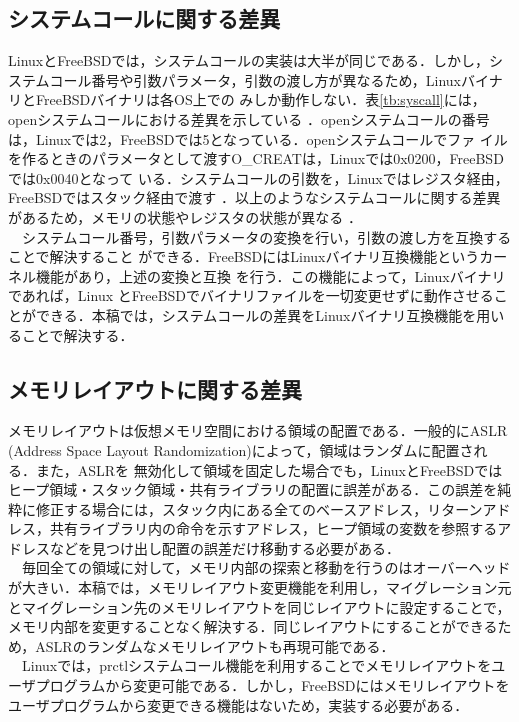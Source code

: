 \documentclass{ipsjpapers}
\begin{document}
\subsection{システムコールに関する差異}
\label{se:syscall}
LinuxとFreeBSDでは，システムコールの実装は大半が同じである．しかし，システムコール番号や引数パラメータ，引数の渡し方が異なるため，LinuxバイナリとFreeBSDバイナリは各OS上での
みしか動作しない．表\ref{tb:syscall}には，openシステムコールにおける差異を示している
．openシステムコールの番号は，Linuxでは2，FreeBSDでは5となっている．openシステムコールでファ
イルを作るときのパラメータとして渡すO\_CREATは，Linuxでは0x0200，FreeBSDでは0x0040となって
いる．システムコールの引数を，Linuxではレジスタ経由，FreeBSDではスタック経由で渡す
．以上のようなシステムコールに関する差異があるため，メモリの状態やレジスタの状態が異なる
．\\
　システムコール番号，引数パラメータの変換を行い，引数の渡し方を互換することで解決すること
ができる．FreeBSDにはLinuxバイナリ互換機能\cite{linux-emu}というカーネル機能があり，上述の変換と互換
を行う．この機能によって，Linuxバイナリであれば，Linux
とFreeBSDでバイナリファイルを一切変更せずに動作させることができる．本稿では，システムコールの差異をLinuxバイナリ互換機能を用いることで解決する．

\subsection{メモリレイアウトに関する差異}
\label{se:memory}
メモリレイアウトは仮想メモリ空間における領域の配置である．一般的にASLR (Address Space
Layout Randomization)によって，領域はランダムに配置される．また，ASLRを
無効化して領域を固定した場合でも，LinuxとFreeBSDではヒープ領域・スタック領域・共有ライブラリの配置に誤差がある．この誤差を純粋に修正する場合には，スタック内にある全てのベースアドレス，リターンアドレス，共有ライブラリ内の命令を示すアドレス，ヒープ領域の変数を参照するアドレスなどを見つけ出し配置の誤差だけ移動する必要がある．\\
　毎回全ての領域に対して，メモリ内部の探索と移動を行うのはオーバーヘッドが大きい．本稿では，メモリレイアウト変更機能を利用し，マイグレーション元とマイグレーション先のメモリレイアウトを同じレイアウトに設定することで，メモリ内部を変更することなく解決する．同じレイアウトにすることができるため，ASLRのランダムなメモリレイアウトも再現可能である．\\
　Linuxでは，prctlシステムコール機能を利用することでメモリレイアウトをユーザプログラムから変更可能である．しかし，FreeBSDにはメモリレイアウトをユーザプログラムから変更できる機能はないため，実装する必要がある．
\end{document}
